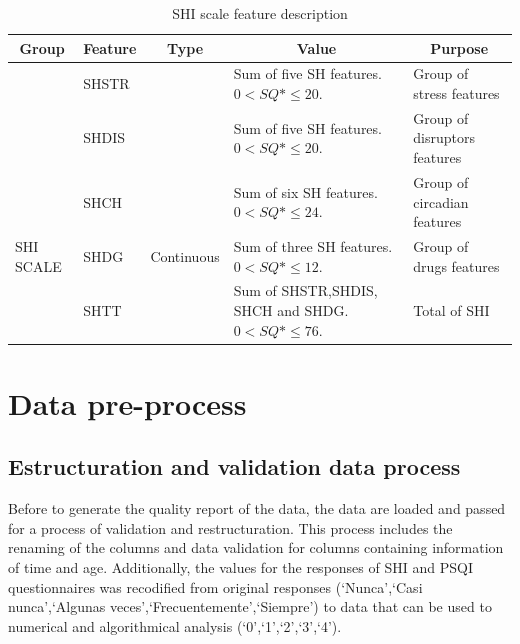 \documentclass[]{book}
\begin{document}
\begin{table}[ht]
    \centering
    \caption{SHI scale feature description}
    \label{tab:SHI-scale-feature-description}
    \begin{tabular}{|l|l|l|p{4cm}|p{4cm}|}
        \hline
        \multicolumn{1}{|c|}{\textbf{Group}} & \multicolumn{1}{c|}{\textbf{Feature}} & \multicolumn{1}{c|}{\textbf{Type}} & \multicolumn{1}{c|}{\textbf{Value}}                    & \multicolumn{1}{c|}{\textbf{Purpose}} \\ \hline
                  & SHSTR                                 &         & Sum of five SH features. $ 0 < SQ*\leq 20 $.           & Group of stress features           \\ \cline{2-2} \cline{4-5} 
        & SHDIS                                 &                                    & Sum of five SH features. $ 0 < SQ*\leq 20 $.           & Group of disruptors features       \\ \cline{2-2} \cline{4-5} 
        \multirow{5}{*}{SHI SCALE} & SHCH          &       \multirow{5}{*}{Continuous}                             & Sum of six SH features. $ 0 < SQ*\leq 24 $.            & Group of circadian features        \\ \cline{2-2} \cline{4-5} 
        & SHDG                                  &                                    & Sum of three SH features. $ 0 < SQ*\leq 12 $.          & Group of drugs features            \\ \cline{2-2} \cline{4-5} 
        & SHTT                                  &                                    & Sum of SHSTR,SHDIS, SHCH and SHDG. $ 0 < SQ*\leq 76 $. & Total of SHI                       \\ \hline
    \end{tabular}
\end{table}

\chapter{Data pre-process}\label{data-pre-process}

\section{Estructuration and validation data
process}\label{estructuration-and-validation-data-process}

Before to generate the quality report of the data, the data are loaded
and passed for a process of validation and restructuration. This process
includes the renaming of the columns and data validation for columns
containing information of time and age. Additionally, the values for the
responses of SHI and PSQI questionnaires was recodified from original
responses (`Nunca',`Casi nunca',`Algunas
veces',`Frecuentemente',`Siempre') to data that can be used to numerical
and algorithmical analysis (`0',`1',`2',`3',`4').
\end{document}

